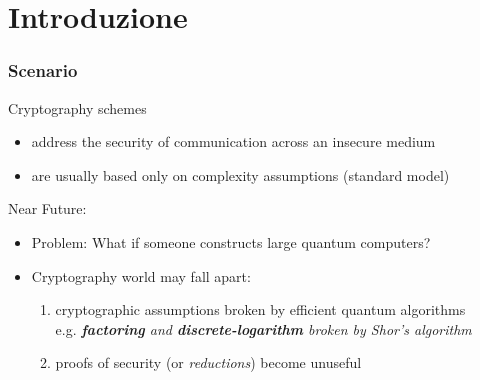 \section{Introduzione}

\begin{frame}
 \frametitle{Scenario}
 \begin{center}
 \end{center}

 \begin{block}{Cryptography schemes}
 \begin{itemize}
  \item address the security of communication across an insecure medium
  \item are usually based only on complexity assumptions (standard model)
 \end{itemize}
 \end{block}
 
 \begin{block}{Near Future:}
 \begin{itemize}
    \item \alert{Problem:} What if someone constructs large quantum computers?
    \item Cryptography world may fall apart:
    \begin{enumerate}
     \item<4-> cryptographic assumptions broken by efficient quantum algorithms \\
	  e.g. \emph{\textbf{factoring} and \textbf{discrete-logarithm} broken by Shor's algorithm}
     \item<5-> proofs of security (or \emph{reductions}) become unuseful 
    \end{enumerate}
 \end{itemize}
\end{block}

\end{frame}

